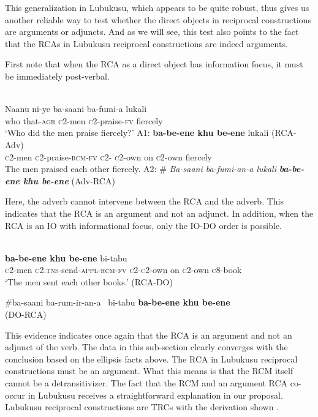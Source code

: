 \documentclass[output=paper]{langsci/langscibook}
\begin{document}
  This generalization in Lubukusu, which appears to be quite robust, thus gives us another reliable way to test whether the direct objects in reciprocal constructions are arguments or adjuncts. And as we will see, this test also points to the fact that the RCAs in Lubukusu reciprocal constructions are indeed  arguments.

First note that when the RCA as a direct object has information focus, it must be immediately post-verbal. 


\ea\label{ex:}
\\
\gll Naanu  ni-ye     ba-saani   ba-fumi-a   lukali \\
who   that-\textsc{agr}  \textsc{c}2-men   \textsc{c}2-praise-\textsc{fv}   fiercely \\
\glt ‘Who did the men praise fiercely?’
  A1: 
      \textbf{{ba-be-ene    khu be-ene}} {  lukali}    (RCA-Adv) \\     \textsc{c}2-men   \textsc{c}2-praise-\textsc{rcm-fv}       \textsc{c}2-\textsc{ c}2-own  on   \textsc{c}2-own  fiercely\\
\glt    The men praised each other fiercely.
  A2:   \#\textit{ Ba-saani ba-fumi-an-a   lukali}\textbf{\textit{       ba-be-ene khu be-ene}}     (Adv-RCA)  
\z


Here, the adverb cannot intervene between the RCA and the adverb. This indicates that the RCA is an argument and not an adjunct. In addition, when the RCA is an IO with informational focus, only the IO-DO order is possible.


\ea\label{ex:}
  \\
\ea
{}    \textbf{{ba-be-ene  khu be-ene}}  bi-tabu      \\
\textsc{c}2-men   \textsc{c2.tns}-send-\textsc{appl-rcm-fv}     \textsc{c2-c2}-own on   \textsc{c}2-own   \textsc{c}8-book       \\
\glt    ‘The men sent each other books.’          (RCA-DO)

\ex
   \#{ba-saani   ba-rum-ir-an-a~  bi-tabu}   \textbf{{ba-be-ene khu be-ene}}\\ 
\glt                      (DO-RCA)
\z
\z

This evidence indicates once again that the RCA is an argument and not an adjunct of the verb. The data in this sub-section clearly converges with the conclusion based on the ellipsis facts above. The RCA in Lubukusu reciprocal constructions must be an argument. What this means is that the RCM itself cannot be a detransitivizer. The fact that the RCM and an argument RCA co-occur in Lubukusu receives a straightforward explanation in our proposal. Lubukusu reciprocal constructions are TRCs with the derivation shown . 
\end{document}
